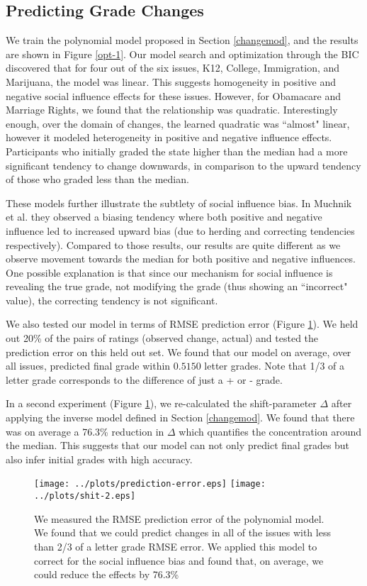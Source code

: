 \subsection{Predicting Grade Changes}
We train the polynomial model proposed in Section \ref{changemod}, and the results are shown in Figure \ref{opt-1}.
Our model search and optimization through the BIC discovered that for four out of the six issues, K12, College, Immigration, and Marijuana, the model was linear.
This suggests homogeneity in positive and negative social influence effects for these issues.
However, for Obamacare and Marriage Rights, we found that the relationship was quadratic.
Interestingly enough, over the domain of changes, the learned quadratic was ``almost" linear, however it modeled heterogeneity in positive and negative influence effects.
Participants who initially graded the state higher than the median had a more significant tendency to change downwards, in comparison to the upward tendency of those who graded less than the median.

These models further illustrate the subtlety of social influence bias. 
In Muchnik et al. they observed a biasing tendency where both positive and negative influence led to increased upward bias (due to herding and correcting tendencies respectively).
Compared to those results, our results are quite different as we observe movement towards the median for both positive and negative influences.
One possible explanation is that since our mechanism for social influence is revealing the true grade, not modifying the grade (thus showing an ``incorrect" value), the correcting tendency is not significant.

We also tested our model in terms of RMSE prediction error (Figure \ref{poly-1}). 
We held out 20\% of the pairs of ratings (observed change, actual) and tested the prediction error on this held out set.
We found that our model on average, over all issues, predicted final grade within $0.5150$ letter grades.
Note that 1/3 of a letter grade corresponds to the difference of just a + or - grade.

In a second experiment (Figure \ref{poly-1}), we re-calculated the shift-parameter $\Delta$ after applying the inverse model defined in Section \ref{changemod}.
We found that there was on average a 76.3\% reduction in $\Delta$ which quantifies the concentration around the median. 
This suggests that our model can not only predict final grades but also infer initial grades with high accuracy.

\begin{figure}[h]
\hspace*{-2em}
    \texttt{[image: ../plots/prediction-error.eps]}
    \hspace*{-2em}
    \texttt{[image: ../plots/shit-2.eps]}
      \caption{We measured the RMSE prediction error of the polynomial model. We found that we could predict changes in all of the issues with less than 2/3 of a letter grade RMSE error. We applied this model to correct for the social influence bias and found that, on average, we could reduce the effects by 76.3\%}
      \label{poly-1}
\end{figure}





